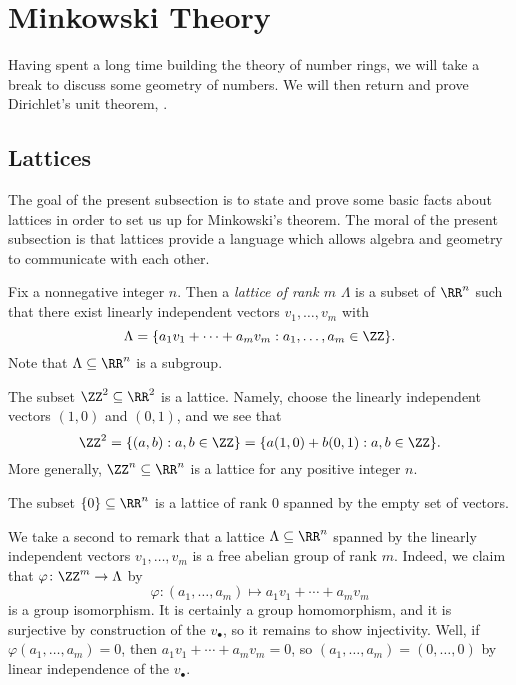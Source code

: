 \documentclass[../notes.tex]{subfiles}
\begin{document}
\section{Minkowski Theory}

Having spent a long time building the theory of number rings, we will take a break to discuss some geometry of numbers. We will then return and prove Dirichlet's unit theorem, .

\subsection{Lattices}
The goal of the present subsection is to state and prove some basic facts about lattices in order to set us up for Minkowski's theorem. The moral of the present subsection is that lattices provide a language which allows algebra and geometry to communicate with each other.
\begin{definition}[lattice]
	Fix a nonnegative integer $n$. Then a \textit{lattice of rank $m$} $\Lambda$ is a subset of $\RR^n$ such that there exist linearly independent vectors $v_1,\ldots,v_m$ with
	\[\Lambda=\{a_1v_1+\cdots+a_mv_m:a_1,\ldots,a_m\in\ZZ\}.\]
	Note that $\Lambda\subseteq\RR^n$ is a subgroup.
\end{definition}
\begin{example} \label{ex:z2-in-r2-lattice}
	The subset $\ZZ^2\subseteq\RR^2$ is a lattice. Namely, choose the linearly independent vectors $(1,0)$ and $(0,1)$, and we see that
	\[\ZZ^2=\{(a,b):a,b\in\ZZ\}=\{a(1,0)+b(0,1):a,b\in\ZZ\}.\]
	More generally, $\ZZ^n\subseteq\RR^n$ is a lattice for any positive integer $n$.
\end{example}
\begin{example}
	The subset $\{0\}\subseteq\RR^n$ is a lattice of rank $0$ spanned by the empty set of vectors.
\end{example}
\begin{remark}
	We take a second to remark that a lattice $\Lambda\subseteq\RR^n$ spanned by the linearly independent vectors $v_1,\ldots,v_m$ is a free abelian group of rank $m$. Indeed, we claim that $\varphi\colon\ZZ^m\to\Lambda$ by
	\[\varphi\colon(a_1,\ldots,a_m)\mapsto a_1v_1+\cdots+a_mv_m\]
	is a group isomorphism. It is certainly a group homomorphism, and it is surjective by construction of the $v_\bullet$, so it remains to show injectivity. Well, if $\varphi(a_1,\ldots,a_m)=0$, then $a_1v_1+\cdots+a_mv_m=0$, so $(a_1,\ldots,a_m)=(0,\ldots,0)$ by linear independence of the $v_\bullet$.
\end{remark}
\end{document}

